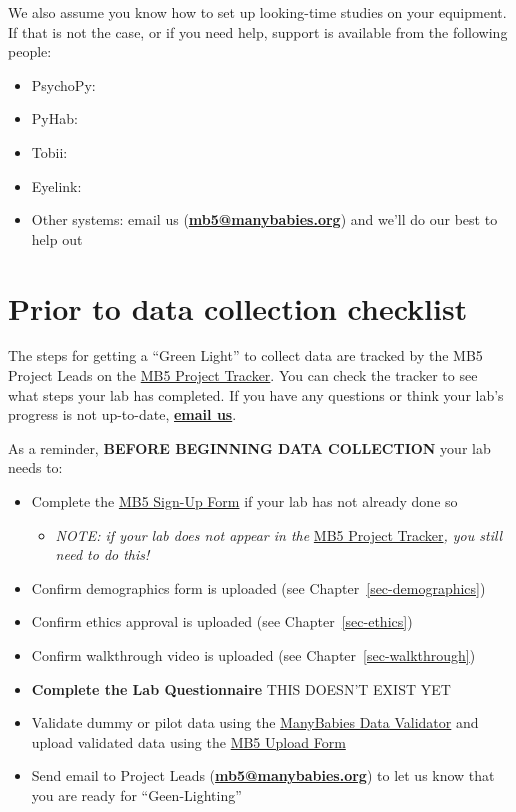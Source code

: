 \documentclass[
  letterpaper,
  DIV=11,
  numbers=noendperiod,
  oneside]{scrreprt}
\providecommand{\tightlist}{%
  \setlength{\itemsep}{0pt}\setlength{\parskip}{0pt}}
\begin{document}
We also assume you know how to set up looking-time studies on your
equipment. If that is not the case, or if you need help, support is
available from the following people:

\begin{itemize}
\tightlist
\item
  PsychoPy:
\item
  PyHab:
\item
  Tobii:
\item
  Eyelink:
\item
  Other systems: email us
  (\href{mailto:mb5@manybabies.org}{\textbf{mb5@manybabies.org}}) and
  we'll do our best to help out
\end{itemize}

\chapter{Prior to data collection
checklist}\label{prior-to-data-collection-checklist}

The steps for getting a ``Green Light'' to collect data are tracked by
the MB5 Project Leads on the
\href{https://airtable.com/appRoqMKzcK3NsXt4/shrLGYAb9VA1VvxOx}{MB5
Project Tracker}. You can check the tracker to see what steps your lab
has completed. If you have any questions or think your lab's progress is
not up-to-date, \href{mailto:mb5@manybabies.org}{\textbf{email us}}.

As a reminder, \textbf{BEFORE BEGINNING DATA COLLECTION} your lab needs
to:

\begin{itemize}
\tightlist
\item
  Complete the
  \href{https://airtable.com/appRoqMKzcK3NsXt4/pag99dsjlXiM24ZnB/form}{MB5
  Sign-Up Form} if your lab has not already done so

  \begin{itemize}
  \tightlist
  \item
    \emph{NOTE: if your lab does not appear in the}
    \href{https://airtable.com/appRoqMKzcK3NsXt4/shrLGYAb9VA1VvxOx}{MB5
    Project Tracker}\emph{, you still need to do this!}
  \end{itemize}
\item
  Confirm demographics form is uploaded (see
  Chapter~\ref{sec-demographics})
\item
  Confirm ethics approval is uploaded (see Chapter~\ref{sec-ethics})
\item
  Confirm walkthrough video is uploaded (see
  Chapter~\ref{sec-walkthrough})
\item
  \textbf{Complete the Lab Questionnaire} THIS DOESN'T EXIST YET
\item
  Validate dummy or pilot data using the
  \href{https://manybabies.org/validator/}{ManyBabies Data Validator}
  and upload validated data using the
  \href{https://airtable.com/appRoqMKzcK3NsXt4/pagPm3MXnFExsz1Ti/form}{MB5
  Upload Form}
\item
  Send email to Project Leads
  (\href{mailto:mb5@manybabies.org}{\textbf{mb5@manybabies.org}}) to let
  us know that you are ready for ``Geen-Lighting''
\end{itemize}
\end{document}
